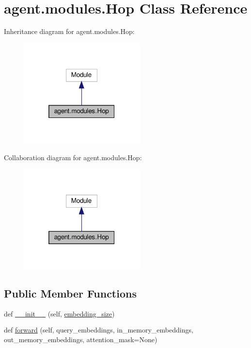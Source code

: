 \hypertarget{classagent_1_1modules_1_1Hop}{}\section{agent.\+modules.\+Hop Class Reference}
\label{classagent_1_1modules_1_1Hop}


Inheritance diagram for agent.\+modules.\+Hop\+:
\nopagebreak
\begin{figure}[H]
\begin{center}
\leavevmode
\includegraphics[width=181pt]{classagent_1_1modules_1_1Hop__inherit__graph}
\end{center}
\end{figure}


Collaboration diagram for agent.\+modules.\+Hop\+:
\nopagebreak
\begin{figure}[H]
\begin{center}
\leavevmode
\includegraphics[width=181pt]{classagent_1_1modules_1_1Hop__coll__graph}
\end{center}
\end{figure}
\subsection*{Public Member Functions}
\begin{DoxyCompactItemize}
\item 
def \hyperlink{classagent_1_1modules_1_1Hop_a3fcdab7229869eed8a4c831c55da4cfe}{\+\_\+\+\_\+init\+\_\+\+\_\+} (self, \hyperlink{classagent_1_1modules_1_1Hop_a9e81d98ac7db15a8fa8f03cfe85111cb}{embedding\+\_\+size})
\item 
def \hyperlink{classagent_1_1modules_1_1Hop_a9b266c14ffbc2ae89147a1ade0b12897}{forward} (self, query\+\_\+embeddings, in\+\_\+memory\+\_\+embeddings, out\+\_\+memory\+\_\+embeddings, attention\+\_\+mask=None)
\end{DoxyCompactItemize}
